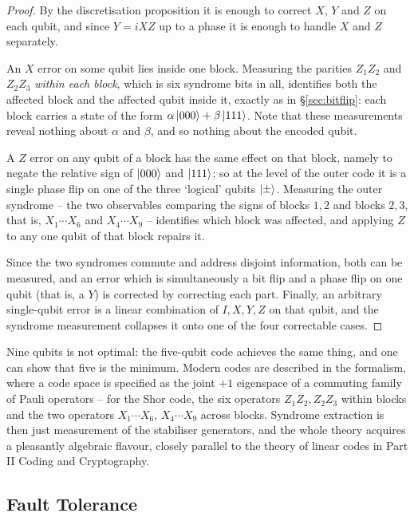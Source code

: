 \documentclass[a4paper]{scrartcl}
\begin{document}
\begin{proof}
	By the discretisation proposition it is enough to correct $X$, $Y$ and $Z$ on each qubit, and since $Y = iXZ$ up to a phase it is enough to handle $X$ and $Z$ separately.

	An $X$ error on some qubit lies inside one block. Measuring the parities $Z_1Z_2$ and $Z_2Z_3$ \emph{within each block}, which is six syndrome bits in all, identifies both the affected block and the affected qubit inside it, exactly as in \S\ref{sec:bitflip}: each block carries a state of the form $\alpha\ket{000}+\beta\ket{111}$. Note that these measurements reveal nothing about $\alpha$ and $\beta$, and so nothing about the encoded qubit.

	A $Z$ error on any qubit of a block has the same effect on that block, namely to negate the relative sign of $\ket{000}$ and $\ket{111}$; so at the level of the outer code it is a single phase flip on one of the three `logical' qubits $\ket\pm$. Measuring the outer syndrome -- the two observables comparing the signs of blocks $1,2$ and blocks $2,3$, that is, $X_1\cdots X_6$ and $X_4\cdots X_9$ -- identifies which block was affected, and applying $Z$ to any one qubit of that block repairs it.

	Since the two syndromes commute and address disjoint information, both can be measured, and an error which is simultaneously a bit flip and a phase flip on one qubit (that is, a $Y$) is corrected by correcting each part. Finally, an arbitrary single-qubit error is a linear combination of $I,X,Y,Z$ on that qubit, and the syndrome measurement collapses it onto one of the four correctable cases.
\end{proof}

\begin{remark}
	Nine qubits is not optimal: the five-qubit code achieves the same thing, and one can show that five is the minimum. Modern codes are described in the  formalism, where a code space is specified as the joint $+1$ eigenspace of a commuting family of Pauli operators -- for the Shor code, the six operators $Z_1Z_2, Z_2Z_3$ within blocks and the two operators $X_1\cdots X_6$, $X_4\cdots X_9$ across blocks. Syndrome extraction is then just measurement of the stabiliser generators, and the whole theory acquires a pleasantly algebraic flavour, closely parallel to the theory of linear codes in Part II Coding and Cryptography.
\end{remark}

\subsection{Fault Tolerance}
\end{document}

